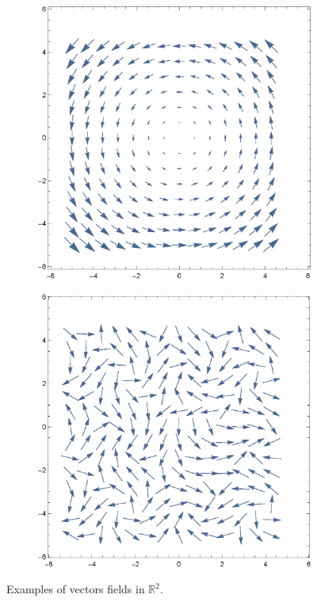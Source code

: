 \begin{figure}[h!]
\begin{subfigure}[c]{0.45\textwidth}
\includegraphics[scale=0.45]{fig/chp2-fig1-c}
\end{subfigure}%
\begin{subfigure}[d]{0.45\textwidth}
\includegraphics[scale=0.45]{fig/chp2-fig1-d}
\end{subfigure}
\caption{Examples of vectors fields in $\mathbb{R}^2$.}
\label{fig:chp2-fig2-vectFields}
\end{figure}


